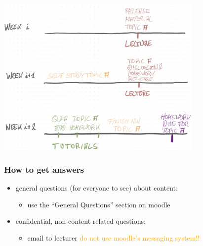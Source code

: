 \documentclass[fleqn,10pt,serif,xcolor=svgnames,xcolor=table,aspectratio=169,handout]{beamer}
\newcommand{\mycom}[1]{\hfill {\mygray{[#1]}}}
\newcommand{\mygray}[1]{\textcolor{gray}{#1}}
\begin{document}
\begin{frame}

  \begin{center}
    \includegraphics[width=0.75\textwidth]{00-introduction-pics/timing-logic.png}
  \end{center}

\end{frame}


\begin{frame}
  \frametitle{How to get answers}
  \begin{itemize}
    \item general questions (for everyone to see) about content:
    \begin{itemize}
      \item use the ``General Questions'' section on moodle
    \end{itemize}
    \item confidential, non-content-related questions:
    \begin{itemize}
      \item email to lecturer \hfill \textcolor{orange}{do not use moodle's messaging system!!}
    \end{itemize}
  \end{itemize}
\end{frame}
\end{document}
